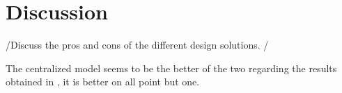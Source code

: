 \newpage
\section{Discussion}
\label{S5}
/{Discuss the pros and cons of the different design solutions.} /



The centralized model seems to be the better of the two regarding the results obtained in , it is better on all point but one. 
